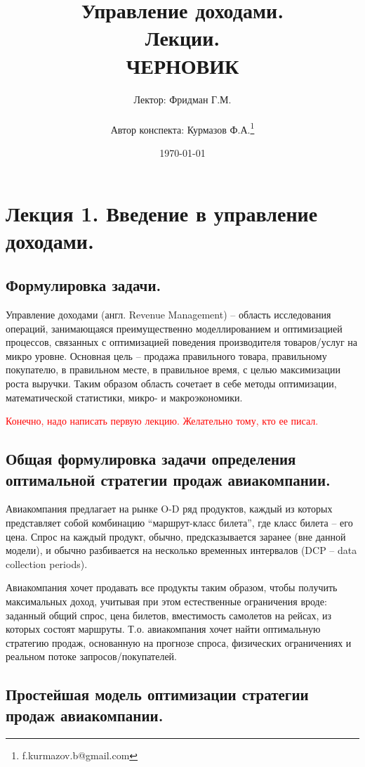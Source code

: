 \documentclass[reqno]{article}
\title{Управление доходами.\\ Лекции.\\ ЧЕРНОВИК}
\author{Лектор: Фридман Г.М.\\  \\ Автор конспекта: Курмазов Ф.А.\thanks{f.kurmazov.b@gmail.com}}
\date{\today}
\theoremstyle{definition}
\theoremstyle{definition}
\theoremstyle{definition}
\theoremstyle{definition}
\theoremstyle{definition}
\theoremstyle{definition}
\theoremstyle{definition}
\theoremstyle{definition}
\theoremstyle{definition}
\begin{document}
	\maketitle

	\tableofcontents


	\newpage
	\section{Лекция 1. Введение в управление доходами.}
		\subsection{Формулировка задачи.}
			
		Управление доходами (англ. Revenue Management) -- область исследования операций, занимающаяся преимущественно моделлированием и оптимизацией процессов, связанных с оптимизацией поведения производителя товаров/услуг на микро уровне. Основная цель -- продажа правильного товара, правильному покупателю, в правильном месте, в правильное время, с целью максимизации роста выручки. Таким образом область сочетает в себе методы оптимизации, математической статистики, микро- и макроэкономики.
		
		\textcolor{red}{Конечно, надо написать первую лекцию. Желательно тому, кто ее писал.}
		
		\subsection{Общая формулировка задачи определения оптимальной стратегии продаж авиакомпании.}
			Авиакомпания предлагает на рынке O-D ряд продуктов, каждый из которых представляет собой комбинацию ``маршрут-класс билета'', где класс билета -- его цена. Спрос на каждый продукт, обычно, предсказывается заранее (вне данной модели), и обычно разбивается на несколько временных интервалов (DCP -- data collection periods).
			
			Авиакомпания хочет продавать все продукты таким образом, чтобы получить максимальных доход, учитывая при этом естественные ограничения вроде: заданный общий спрос, цена билетов, вместимость самолетов на рейсах, из которых состоят маршруты. Т.о. авиакомпания хочет найти оптимальную стратегию продаж, основанную на прогнозе спроса, физических ограничениях и реальном потоке запросов/покупателей.
		
		\subsection{Простейшая модель оптимизации стратегии продаж авиакомпании.}
	
\end{document}
